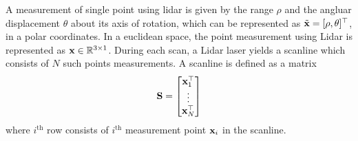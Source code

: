 A measurement of single point using lidar is given by the range $\rho$ and the angluar displacement $\theta$ about its axis of rotation, which can be represented as $\tilde{\mathbf{x}} = [\rho, \theta]^\top$, in a polar coordinates.
In a euclidean space, the point measurement using Lidar is represented as $\mathbf{x} \in \mathbb{R}^{3 \times 1}$. 
During each scan, a Lidar laser yields a scanline which consists of $N$ such points measurements. 
A scanline is defined as a matrix 
\begin{align}
	\mathbf{S} = \begin{bmatrix}
		\mathbf{x}_1^\top \\ \vdots \\ \mathbf{x}_N^\top
	\end{bmatrix}
\end{align}
where $i^{\text{th}}$ row consists of $i^{\text{th}}$ measurement point $\mathbf{x}_i$ in the scanline.

